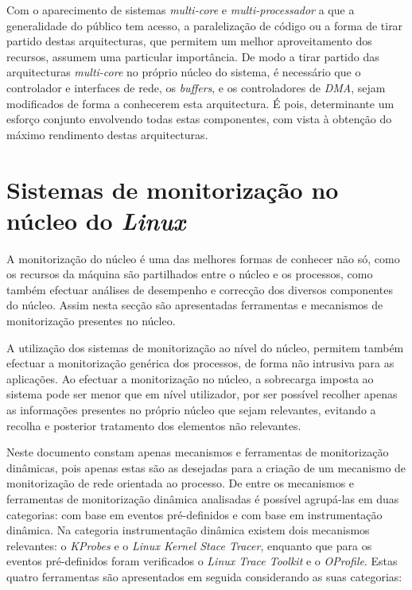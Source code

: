 Com o aparecimento de sistemas \textit{multi-core} e \textit{multi-processador} a que a generalidade do público tem acesso, a paralelização de código ou a forma de tirar partido destas arquitecturas, que permitem um melhor aproveitamento dos recursos, assumem uma particular importância.
De modo a tirar partido das arquitecturas \textit{multi-core} no próprio núcleo do sistema, é necessário que o controlador e interfaces de rede, os \textit{buffers}, e os controladores de \textit{DMA}, sejam modificados de forma a conhecerem esta arquitectura.
É pois, determinante um esforço conjunto envolvendo todas estas componentes, com vista à obtenção do máximo rendimento destas arquitecturas\cite{Deri:2010}.



\section{Sistemas de monitorização no núcleo do \textit{Linux}}\label{sect:instrumentacao_casos_linux}

A monitorização do núcleo é uma das melhores formas de conhecer não só, como os recursos da máquina são partilhados entre o núcleo e os processos, como também efectuar análises de desempenho e correcção dos diversos componentes do núcleo.
Assim nesta secção são apresentadas ferramentas e mecanismos de monitorização presentes no núcleo.

A utilização dos sistemas de monitorização ao nível do núcleo, permitem também efectuar a monitorização genérica dos processos, de forma não intrusiva para as aplicações.
Ao efectuar a monitorização no núcleo, a sobrecarga imposta ao sistema pode ser menor que em nível utilizador, por ser possível recolher apenas as informações presentes no próprio núcleo que sejam relevantes, evitando a recolha e posterior tratamento dos elementos não relevantes.

Neste documento constam apenas mecanismos e ferramentas de monitorização dinâmicas, pois apenas estas são as desejadas para a criação de um mecanismo de monitorização de rede orientada ao processo.
De entre os mecanismos e ferramentas de monitorização dinâmica analisadas é possível agrupá-las em duas categorias: com base em eventos pré-definidos e com base em instrumentação dinâmica.
Na categoria instrumentação dinâmica existem dois mecanismos relevantes: o \textit{KProbes} e o \textit{Linux Kernel Stace Tracer}, enquanto que para os eventos pré-definidos foram verificados o \textit{Linux Trace Toolkit} e o \textit{OProfile}.
Estas quatro ferramentas são apresentados em seguida considerando as suas categorias:

